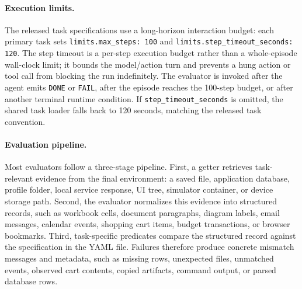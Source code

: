 \paragraph{Execution limits.}
The released task specifications use a long-horizon interaction budget: each primary task sets \texttt{limits.max\_steps: 100} and \texttt{limits.step\_timeout\_seconds: 120}. The step timeout is a per-step execution budget rather than a whole-episode wall-clock limit; it bounds the model/action turn and prevents a hung action or tool call from blocking the run indefinitely. The evaluator is invoked after the agent emits \texttt{DONE} or \texttt{FAIL}, after the episode reaches the 100-step budget, or after another terminal runtime condition. If \texttt{step\_timeout\_seconds} is omitted, the shared task loader falls back to 120 seconds, matching the released task convention.

\paragraph{Evaluation pipeline.}
Most evaluators follow a three-stage pipeline. First, a getter retrieves task-relevant evidence from the final environment: a saved file, application database, profile folder, local service response, UI tree, simulator container, or device storage path. Second, the evaluator normalizes this evidence into structured records, such as workbook cells, document paragraphs, diagram labels, email messages, calendar events, shopping cart items, budget transactions, or browser bookmarks. Third, task-specific predicates compare the structured record against the specification in the YAML file. Failures therefore produce concrete mismatch messages and metadata, such as missing rows, unexpected files, unmatched events, observed cart contents, copied artifacts, command output, or parsed database rows.

